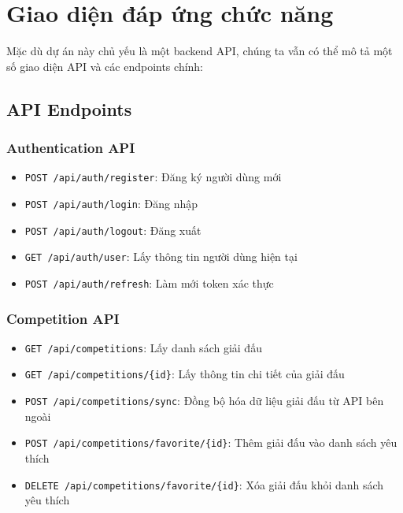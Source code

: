 \documentclass[a4paper,12pt]{report}
\begin{document}
\section{Giao diện đáp ứng chức năng}

Mặc dù dự án này chủ yếu là một backend API, chúng ta vẫn có thể mô tả một số giao diện API và các endpoints chính:

\subsection{API Endpoints}

\subsubsection{Authentication API}
\begin{itemize}
    \item \texttt{POST /api/auth/register}: Đăng ký người dùng mới
    \item \texttt{POST /api/auth/login}: Đăng nhập
    \item \texttt{POST /api/auth/logout}: Đăng xuất
    \item \texttt{GET /api/auth/user}: Lấy thông tin người dùng hiện tại
    \item \texttt{POST /api/auth/refresh}: Làm mới token xác thực
\end{itemize}

\subsubsection{Competition API}
\begin{itemize}
    \item \texttt{GET /api/competitions}: Lấy danh sách giải đấu
    \item \texttt{GET /api/competitions/\{id\}}: Lấy thông tin chi tiết của giải đấu
    \item \texttt{POST /api/competitions/sync}: Đồng bộ hóa dữ liệu giải đấu từ API bên ngoài
    \item \texttt{POST /api/competitions/favorite/\{id\}}: Thêm giải đấu vào danh sách yêu thích
    \item \texttt{DELETE /api/competitions/favorite/\{id\}}: Xóa giải đấu khỏi danh sách yêu thích
\end{itemize}
\end{document}
